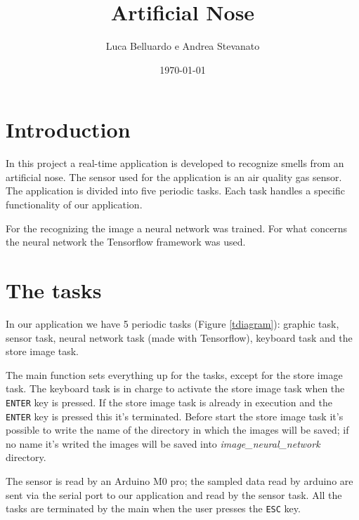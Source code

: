 \documentclass[12pt]{article}
\title{Artificial Nose}
\author{Luca Belluardo e Andrea Stevanato}
\date{\today}
\begin{document}
\maketitle

\section{Introduction}
In this project a real-time application is developed to recognize smells from an
artificial nose. The sensor used for the application is an air quality gas 
sensor. The application is divided into five periodic tasks. Each task handles
a specific functionality of our application.

For the recognizing the image a neural network was trained. For what concerns
the neural network the Tensorflow framework was used.


\section{The tasks}
In our application we have 5 periodic tasks (Figure \ref{tdiagram}): graphic
task, sensor task, neural network task (made with Tensorflow), keyboard task
and the store image task.

The main function sets everything up for the tasks, except for the store
image task. The keyboard task is in charge to activate the store image task
when the \texttt{ENTER} key is pressed. If the store image task is already in
execution and the \texttt{ENTER} key is pressed this it's terminated.
Before start the store image task it's possible to write the name of the
directory in which the images will be saved; if no name it's writed the
images will be saved into \textit{image\_neural\_network} directory.

The sensor is read by an Arduino M0 pro; the sampled data read by arduino
are sent via the serial port to our application and read by the sensor
task. All the tasks are terminated by the main when the user presses the
\texttt{ESC} key.
\end{document}
